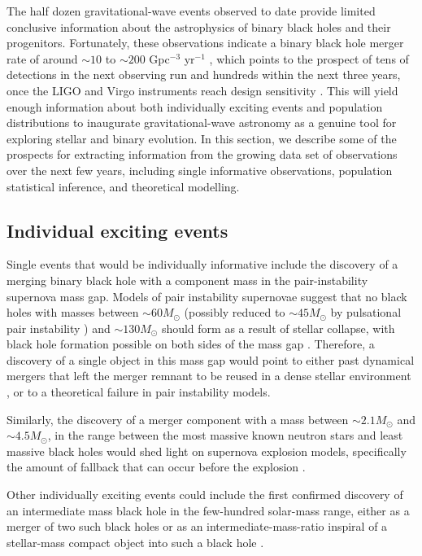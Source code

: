 \documentclass[iop,onecolumn]{revtex4}
\begin{document}
The half dozen gravitational-wave events observed to date provide limited conclusive information about the astrophysics of binary black holes and their progenitors.  Fortunately, these observations indicate a binary black hole merger rate of around $\sim 10$ to $\sim 200$ Gpc$^{-3}$ yr$^{-1}$ \citep{GW150914:rates,GW170104}, which points to the prospect of tens of detections in the next observing run and hundreds within the next three years, once the LIGO and Virgo instruments reach design sensitivity \citep{scenarios}.  This will yield enough information about both individually exciting events and population distributions to inaugurate gravitational-wave astronomy as a genuine tool for exploring stellar and binary evolution.  In this section, we describe some of the prospects for extracting information from the growing data set of observations over the next few years, including single informative observations, population statistical inference, and theoretical modelling.

\subsection{Individual exciting events}
Single events that would be individually informative include the discovery of a merging binary black hole with a component mass in the pair-instability supernova mass gap.  Models of pair instability supernovae suggest that no black holes with masses between $\sim 60 M_\odot$ (possibly reduced to $\sim 45 M_\odot$ by pulsational pair instability \citep{Woosley:2017}) and $\sim 130 M_\odot$ should form as a result of stellar collapse, with black hole formation possible on both sides of the mass gap \citep{Marchant:2016}.  Therefore, a discovery of a single object in this mass gap would point to either past dynamical mergers that left the merger remnant to be reused in a dense stellar environment \citep{Rodriguez:2018}, or to a theoretical failure in pair instability models. 

Similarly, the discovery of a merger component with a mass between $\sim 2.1 M_\odot$ and $\sim 4.5 M_\odot$, in the range between the most massive known neutron stars and least massive black holes \citep{Ozel:2010,Farr:2011} would shed light on supernova explosion models, specifically the amount of fallback that can occur before the explosion \citep{Fryer:2012}.

Other individually exciting events could include the first confirmed discovery of an intermediate mass black hole in the few-hundred solar-mass range, either as a merger of two such black holes \citep[e.g.,][]{AmaroSeoaneSantamaria:2009,Veitch:2015,Graff:2015} or as an intermediate-mass-ratio inspiral of a stellar-mass compact object into such a black hole \citep[e.g.,][]{Mandel:2008,Haster:2015IMRI,Haster:2016}. 
\end{document}
